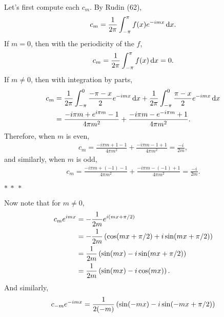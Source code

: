 \documentclass[12pt]{article}
\begin{document}
\begin{fproof}[2(a)]
 
\end{fproof}

\begin{fproof}[2(b)]
 
\end{fproof}
\newpage

\begin{fproof}[3(a)]
 Let's first compute each \(c_m\).
 By Rudin (62),
 \begin{align*}
   c_m 
   = \frac{1}{2\pi} \int_{-\pi}^{\pi} f(x) e^{-imx} \mathop{}\!\mathrm{d} x.
 \end{align*}
 If \(m = 0\), then with the periodicity of the \(f\),
 \begin{align*}
   c_m = \frac{1}{2 \pi} \int_{-\pi}^{\pi} f(x) \mathop{}\!\mathrm{d} x = 0.
 \end{align*}
 If \(m \neq 0\), then with integration by parts,
 \begin{align*}
   c_m 
   &= \frac{1}{2\pi} \int_{-\pi}^{0} \frac{-\pi-x}{2} e^{-imx} \mathop{}\!\mathrm{d} x + \frac{1}{2\pi} \int_{-\pi}^{0} \frac{\pi-x}{2} e^{-imx} \mathop{}\!\mathrm{d} x\\
   & = \frac{-i\pi m +e^{i\pi m} - 1}{4 \pi m^2} + \frac{-i\pi m - e^{-i\pi m} + 1}{4 \pi m^2}.
 \end{align*}
 Therefore, when \(m\) is even,
 \begin{align*}
   c_m = \frac{-i \pi m + 1 - 1}{4 \pi m^2} + \frac{-i \pi m - 1 + 1}{4 \pi m^2} = \frac{-i}{2m},
 \end{align*}
 and similarly, when \(m\) is odd,
 \begin{align*}
   c_m = \frac{-i \pi m + (-1) - 1}{4 \pi m^2} + \frac{-i \pi m - (-1) + 1}{4 \pi m^2} = \frac{-i}{2m}.
 \end{align*}
 \begin{center}
   \(\ast~\ast~\ast\)
 \end{center}
 Now note that for \(m \neq 0\),
 \begin{align*}
   c_m e^{imx}
   &= -\frac{1}{2m}e^{i(mx + \pi/2)}\\
   &= -\frac{1}{2m} \left( \cos(mx + \pi/2) + i \sin(mx + \pi/2) \right)\\
   &= \frac{1}{2m} \left( \sin(mx) - i \sin(mx + \pi/2) \right)\\
   &= \frac{1}{2m} \left( \sin(mx) - i\cos(mx) \right).
 \end{align*}
 And similarly,
 \begin{align*}
   c_{-m}e^{-imx}
   & = \frac{1}{2(-m)}\pare{\sin(-mx) - i\sin(-mx + \pi/2)}\\

\end{align*}
\end{fproof}
\end{document}
